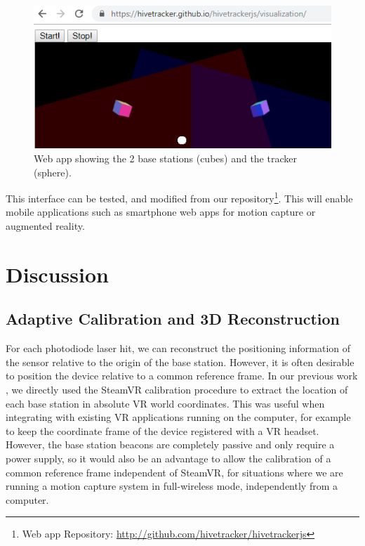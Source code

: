 \documentclass[sigchi]{acmart}
\begin{document}
\begin{figure}[h]
  \centering
  \includegraphics[width=\linewidth]{Figures/webapp.png}
  \caption{Web app showing the 2 base stations (cubes) and the tracker (sphere).}
  \label{Fig:webapp}
\end{figure}

This interface can be tested, and modified from our repository\footnote{Web app Repository: \url{http://github.com/hivetracker/hivetrackerjs}}. This will enable mobile applications such as smartphone web apps for motion capture or augmented reality.


\section{Discussion}

\subsection{Adaptive Calibration and 3D Reconstruction}

For each photodiode laser hit, we can reconstruct the positioning information of the sensor relative to the origin of the base station. However, it is often desirable to position the device relative to a common reference frame. In our previous work \cite{Quinones2018}, we directly used the SteamVR calibration procedure to extract the location of each base station in absolute VR world coordinates. This was useful when integrating with existing VR applications running on the computer, for example to keep the coordinate frame of the device registered with a VR headset. However, the base station beacons are completely passive and only require a power supply, so it would also be an advantage to allow the calibration of a common reference frame independent of SteamVR, for situations where we are running a motion capture system in full-wireless mode, independently from a computer.
\end{document}
